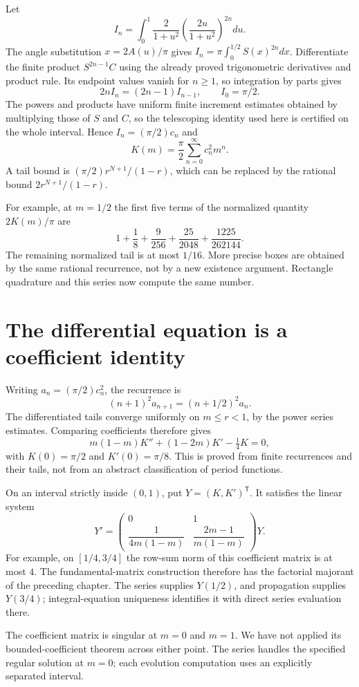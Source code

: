 Let
\[
 I_n=\int_0^1\frac2{1+u^2}
          \left(\frac{2u}{1+u^2}\right)^{2n}du.
\]
The angle substitution $x=2A(u)/\pi$ gives
$I_n=\pi\int_0^{1/2}S(x)^{2n}dx$.  Differentiate the finite product
$S^{2n-1}C$ using the already proved trigonometric derivatives and product
rule.  Its endpoint values vanish for $n\ge1$, so integration by parts
gives
\[
 2n I_n=(2n-1)I_{n-1},\qquad I_0=\pi/2.
\]
The powers and products have uniform finite increment estimates obtained
by multiplying those of $S$ and $C$, so the telescoping identity used here
is certified on the whole interval.  Hence $I_n=(\pi/2)c_n$ and
\[
 \boxed{K(m)=\frac\pi2\sum_{n=0}^{\infty}c_n^2m^n.}
\]
A tail bound is $(\pi/2)r^{N+1}/(1-r)$, which can be replaced by the
rational bound $2r^{N+1}/(1-r)$.

For example, at $m=1/2$ the first five terms of the normalized quantity
$2K(m)/\pi$ are
\[
 1+\frac18+\frac9{256}+\frac{25}{2048}
          +\frac{1225}{262144}.
\]
The remaining normalized tail is at most $1/16$.  More precise boxes
are obtained by the same rational recurrence, not by a new existence
argument.  Rectangle quadrature and this series now compute the same number.

\section{The differential equation is a coefficient identity}
Writing $a_n=(\pi/2)c_n^2$, the recurrence is
\[
 (n+1)^2a_{n+1}=(n+1/2)^2a_n.
\]
The differentiated tails converge uniformly on $m\le r<1$, by the power
series estimates.  Comparing coefficients therefore gives
\[
 \boxed{m(1-m)K''+(1-2m)K'-\tfrac14K=0,}
\]
with $K(0)=\pi/2$ and $K'(0)=\pi/8$.
This is proved from finite recurrences and their tails, not from an abstract
classification of period functions.

On an interval strictly inside $(0,1)$, put $Y=(K,K')^{\mathsf T}$.  It
satisfies the linear system
\[
 Y'=\begin{pmatrix}
 0&1\\
 \dfrac1{4m(1-m)}&\dfrac{2m-1}{m(1-m)}
 \end{pmatrix}Y.
\]
For example, on $[1/4,3/4]$ the row-sum norm of this coefficient matrix is
at most $4$.  The fundamental-matrix construction therefore has the
factorial majorant of the preceding chapter.  The series supplies
$Y(1/2)$, and propagation supplies $Y(3/4)$; integral-equation uniqueness
identifies it with direct series evaluation there.

The coefficient matrix is singular at $m=0$ and $m=1$.  We have not
applied its bounded-coefficient theorem across either point.  The series
handles the specified regular solution at $m=0$; each evolution computation
uses an explicitly separated interval.


